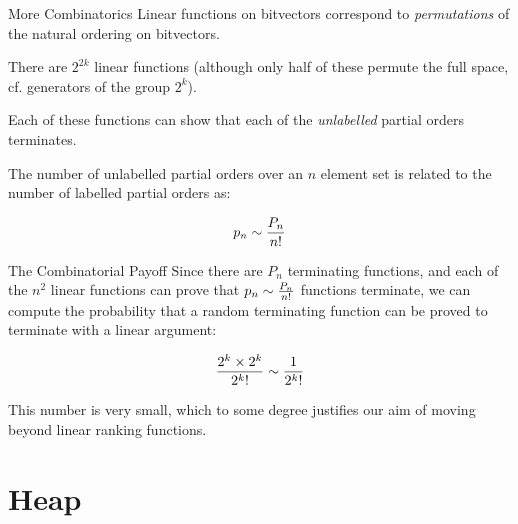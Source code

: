 \documentclass[xcolor=pdftex,t,11pt]{beamer}
\begin{document}
\begin{frame}{More Combinatorics}
Linear functions on bitvectors correspond to \emph{permutations} of the natural ordering on bitvectors.

\vspace{1em}

There are $2^{2k}$ linear functions (although only half of these permute the full space, cf. generators of the group $2^k$).

\vspace{1em}

Each of these functions can show that each of the \emph{unlabelled} partial orders terminates.

The number of unlabelled partial orders over an $n$ element set is related to the number of labelled partial orders as:

$$p_n \sim {P_n \over n!}$$
\end{frame}

\begin{frame}{The Combinatorial Payoff}
Since there are $P_n$ terminating functions, and each of the $n^2$ linear functions can prove that
$p_n \sim {P_n \over n!}$ functions terminate, we can compute the probability that a random terminating
function can be proved to terminate with a linear argument:

$${2^k \times 2^k \over {2^k}!} \sim {1 \over {2^k}!}$$

\pause

\vspace{1em}

This number is very small, which to some degree justifies our aim of moving beyond linear ranking functions.

\end{frame}

\section{Heap}
\end{document}

